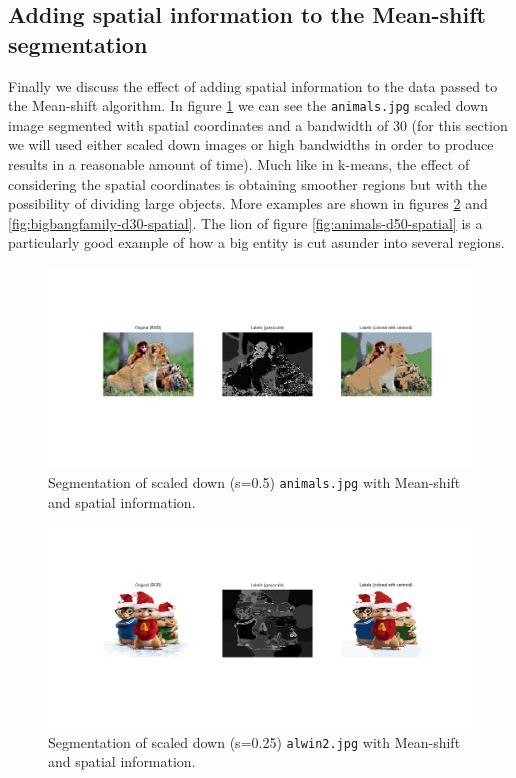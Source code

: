 \FloatBarrier

\subsection{Adding spatial information to the Mean-shift segmentation}

Finally we discuss the effect of adding spatial information to the data passed to the
Mean-shift algorithm. In figure \ref{fig:animals-d30-spatial} we can see the
\texttt{animals.jpg} scaled down image segmented with spatial coordinates and a bandwidth of
30 (for this section we will used either scaled down images or high bandwidths in order
to produce results in a reasonable amount of time). Much like in k-means, the effect of
considering the spatial coordinates is obtaining smoother regions but with the possibility
of dividing large objects. More examples are shown in figures \ref{fig:alwin2-d30-spatial} and
\ref{fig:bigbangfamily-d30-spatial}. The lion
of figure \ref{fig:animals-d50-spatial} is a particularly good example of how a big entity
is cut asunder into several regions.

\begin{figure}[hbt]
\centering
\includegraphics[trim={50px 100px 50px 100px},clip,width=\textwidth]{img/mshift/animals_d30_spatial_scaled_down.png}
\caption{Segmentation of scaled down (s=0.5) \texttt{animals.jpg} with Mean-shift and spatial information.}
\label{fig:animals-d30-spatial}
\end{figure}

\begin{figure}[hbt]
\centering
\includegraphics[trim={50px 100px 50px 100px},clip,width=\textwidth]{img/mshift/alwin2_d30_spatial.png}
\caption{Segmentation of scaled down (s=0.25) \texttt{alwin2.jpg} with Mean-shift and spatial information.}
\label{fig:alwin2-d30-spatial}
\end{figure}

